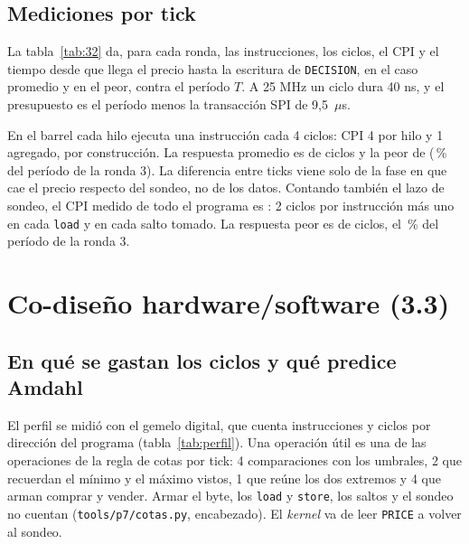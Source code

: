 \documentclass[11pt,a4paper]{article}
\newcommand{\tablaancha}[1]{\resizebox{\linewidth}{!}{}}
\newcommand{\arch}[1]{\texttt{#1}}
\begin{document}
\subsection{Mediciones por tick}\label{sec:ticks}

La tabla~\ref{tab:32} da, para cada ronda, las instrucciones, los ciclos, el CPI y el tiempo desde que llega el precio hasta la escritura de \texttt{DECISION}, en el caso promedio y en el peor, contra el período $T$. A 25 MHz un ciclo dura 40 ns, y el presupuesto es el período menos la transacción SPI de 9,5~$\mu$s.

\begin{table}[H]\centering
\caption{Instrucciones, ciclos, CPI y tiempo por tick, promedio y peor caso, en las tres rondas.}\label{tab:32}
\tablaancha{generado/t32.tex}
\end{table}

\ifpeldanofondo
\begin{table}[H]\centering
\caption{Instrucciones y ciclos de trabajo por hilo en la ronda 3.}\label{tab:32h}
\tablaancha{generado/t32hilos.tex}
\end{table}
En el barrel cada hilo ejecuta una instrucción cada 4 ciclos: CPI 4 por hilo y 1 agregado, por construcción. La respuesta promedio es de \cifraRespProm{} ciclos y la peor de \cifraRespPeor{} (\cifraUsoRondaTres\,\% del período de la ronda 3). La diferencia entre ticks viene solo de la fase en que cae el precio respecto del sondeo, no de los datos.
\else
Contando también el lazo de sondeo, el CPI medido de todo el programa es \cifraCPIPrograma: 2 ciclos por instrucción más uno en cada \texttt{load} y en cada salto tomado. La respuesta peor es de \cifraRespPeor{} ciclos, el \cifraUsoRondaTres\,\% del período de la ronda 3.
\fi

\section{Co-diseño hardware/software (3.3)}

\subsection{En qué se gastan los ciclos y qué predice Amdahl}

El perfil se midió con el gemelo digital, que cuenta instrucciones y ciclos por dirección del programa (tabla~\ref{tab:perfil}). Una operación útil es una de las \pCotasOps{} operaciones de la regla de cotas por tick: 4 comparaciones con los umbrales, 2 que recuerdan el mínimo y el máximo vistos, 1 que reúne los dos extremos y 4 que arman comprar y vender. Armar el byte, los \texttt{load} y \texttt{store}, los saltos y el sondeo no cuentan (\arch{tools/p7/cotas.py}, encabezado). El \emph{kernel} va de leer \texttt{PRICE} a volver al sondeo.
\end{document}
